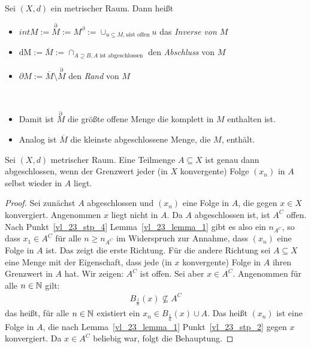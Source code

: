 \begin{Definition}{%
	Sei $(X,d)$ ein metrischer Raum. Dann heißt
	\begin{itemize}
		\item $int M := \overset{\partial}{M} := M^{\partial} := \cup_{u \subseteq M, u \text{ist offen}} u $ das \emph{Inverse von $M$}
		\item $\mathrm{dM} := \overline{M} := \cap_{A \supseteq B, A \text{ ist abgeschlossen}}$ den \emph{Abschluss} von $M$ 
		\item $\partial M := \overline{M} \setminus \overset{\partial}{M}$ 
		den \emph{Rand} von $M$
	\end{itemize}
}\end{Definition}

\begin{Bemerkung}{
	~\begin{itemize}
		\item Damit ist $\overset{\partial}{M}$ die größte offene Menge die komplett in 
	$M$ enthalten ist.
		\item Analog ist $\overline{M}$ die kleinste abgeschlossene Menge, die $M$, 
			enthält.
	\end{itemize}
}\end{Bemerkung}

\begin{Proposition}{\label{vl_23_prop_2}%
	Sei $(X,d)$ metrischer Raum. Eine Teilmenge $A \subseteq X$ ist genau dann 
	abgeschlossen, wenn der Grenzwert jeder (in $X$ konvergente) Folge 
	$(x_n)$ in $A$ selbst wieder in $A$ liegt. 
}\end{Proposition}

\begin{proof}
	Sei zunächst $A$ abgeschlossen und $(x_n)$ eine Folge in $A$, die gegen 
	$x \in X$ konvergiert. Angenommen $x$ liegt nicht in $A$. Da $A$ abgeschlossen 
	ist, ist $A^C$ offen. Nach Punkt~\ref{vl_23_stp_4} Lemma~\ref{vl_23_lemma_1} 
	gibt es also ein $n_{A^C}$, so dass $x_1 \in A^C$ für alle $ n \geq n_{A^C}$ 
	im Widerspruch zur Annahme, dass $(x_n)$ eine Folge in $A$ ist. 
	Das zeigt die erste Richtung. Für die andere Richtung sei $A \subseteq X$ 
	eine Menge mit der Eigenschaft, dass jede (in $x$ konvergente) Folge in $A$ 
	ihren Grenzwert in $A$ hat. Wir zeigen: $A^C$ ist offen. Sei aber 
	$x \in A^C$. Angenommen für alle $n \in \mathbb{N}$ gilt: 
	\begin{align*}
		B_{\frac{1}{n}}(x) \not \subseteq A^C
	\end{align*}
	das heißt, für alle $n \in \mathbb{N}$ existiert ein $x_n \in B_{\frac{1}{n}}(x) 
	\cup A$. Das heißt $(x_n)$ ist eine Folge in $A$, die nach Lemma~\ref{vl_23_lemma_1}
	Punkt~\ref{vl_23_stp_2} gegen $x$ konvergiert.
	Da $x \in A^C$ beliebig war, folgt die Behauptung.
\end{proof}

